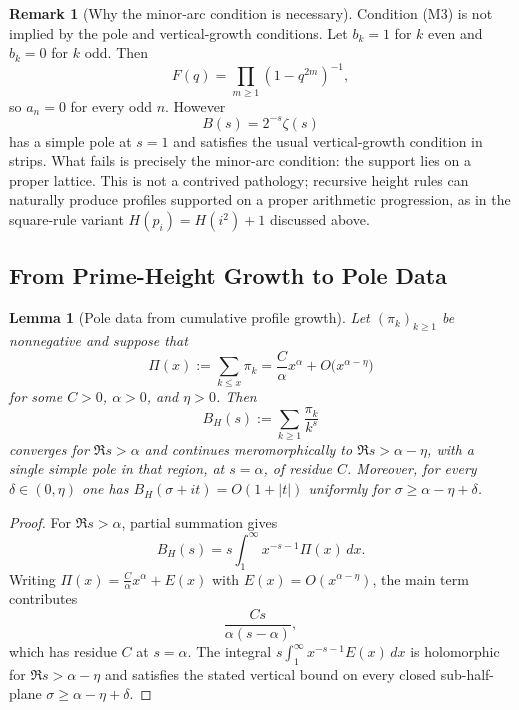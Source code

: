 \documentclass[11pt]{article}
\newtheorem{lemma}{Lemma}
\theoremstyle{definition}
\newtheorem{remark}{Remark}
\begin{document}
\begin{remark}[Why the minor-arc condition is necessary]
\label{rem:M3-necessary}
Condition \textup{(M3)} is not implied by the pole and vertical-growth
conditions.  Let $b_k=1$ for $k$ even and $b_k=0$ for $k$ odd.  Then
\[
  F(q)=\prod_{m\ge1}(1-q^{2m})^{-1},
\]
so $a_n=0$ for every odd $n$.  However
\[
  B(s)=2^{-s}\zeta(s)
\]
has a simple pole at $s=1$ and satisfies the usual vertical-growth condition in
strips.  What fails is precisely the minor-arc condition: the support lies on a
proper lattice.  This is not a contrived pathology; recursive height rules can naturally produce profiles supported on a proper arithmetic progression, as in the square-rule variant \(H(p_i)=H(i^2)+1\) discussed above.
\end{remark}

\subsection{From Prime-Height Growth to Pole Data}

\begin{lemma}[Pole data from cumulative profile growth]
\label{lem:pole-from-partial-sums}
Let $(\pi_k)_{k\ge1}$ be nonnegative and suppose that
\begin{equation}\label{eq:pi-partial-sum}
  \Pi(x):=\sum_{k\le x}\pi_k
  =
  \frac{C}{\alpha}x^\alpha+O\bigl(x^{\alpha-\eta}\bigr)
\end{equation}
for some $C>0$, $\alpha>0$, and $\eta>0$.  Then
\[
  B_H(s):=\sum_{k\ge1}\frac{\pi_k}{k^s}
\]
converges for $\Re s>\alpha$ and continues meromorphically to
$\Re s>\alpha-\eta$, with a single simple pole in that region, at $s=\alpha$,
of residue $C$.  Moreover, for every $\delta\in(0,\eta)$ one has
$B_H(\sigma+it)=O(1+|t|)$ uniformly for
$\sigma\ge\alpha-\eta+\delta$.
\end{lemma}

\begin{proof}
For $\Re s>\alpha$, partial summation gives
\[
  B_H(s)=s\int_1^\infty x^{-s-1}\Pi(x)\,dx.
\]
Writing $\Pi(x)=\frac{C}{\alpha}x^\alpha+E(x)$ with
$E(x)=O(x^{\alpha-\eta})$, the main term contributes
\[
  \frac{Cs}{\alpha(s-\alpha)},
\]
which has residue $C$ at $s=\alpha$.  The integral
$s\int_1^\infty x^{-s-1}E(x)\,dx$ is holomorphic for
$\Re s>\alpha-\eta$ and satisfies the stated vertical bound on every closed
sub-half-plane $\sigma\ge\alpha-\eta+\delta$.
\end{proof}
\end{document}
